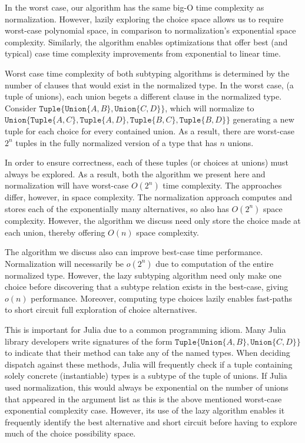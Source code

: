 \documentclass[a4paper,english]{lipics-v2019}
\newcommand{\xt}[1]{\texttt{#1}}
\newcommand{\union}[2]{\xt{Union\{}#1,#2\xt{\}}}
\newcommand{\tuple}[1]{\xt{Tuple\{}#1\xt{\}}}
\begin{document}
\noindent
In the worst case, our algorithm has the same big-O time complexity as
normalization. However, lazily exploring the choice space allows us to
require worst-case polynomial space, in comparison to normalization's
exponential space complexity.  Similarly, the algorithm enables
optimizations that offer best (and typical) case time complexity
improvements from exponential to linear time.

Worst case time complexity of both subtyping algorithms is determined by the
number of clauses that would exist in the normalized type. In the worst case,
(a tuple of unions), each union begets a different clause in the normalized
type. Consider $\tuple{\union{A}{B}, \union{C}{D}}$, which will normalize to
$\union{\tuple{A,C}}{\tuple{A, D}, \tuple{B, C}, \tuple{B, D}}$ generating a 
new tuple for each choice for every contained union. As a result, there are
worst-case $2^n$ tuples in the fully normalized version of a type that has $n$
unions.

In order to ensure correctness, each of these tuples (or choices at unions)
must always be explored. As a result, both the algorithm we present here and
normalization will have worst-case $O(2^n)$ time complexity. The approaches
differ, however, in space complexity. The normalization approach computes and
stores each of the exponentially many alternatives, so also has $O(2^n)$ space
complexity. However, the algorithm we discuss need only store the choice made
at each union, thereby offering $O(n)$ space complexity.

The algorithm we discuss also can improve best-case time performance.
Normalization will necessarily be $o(2^n)$ due to computation of the entire
normalized type. However, the lazy subtyping algorithm need only make one
choice before discovering that a subtype relation exists in the best-case,
giving $o(n)$ performance. Moreover, computing type choices lazily enables
fast-paths to short circuit full exploration of choice alternatives.

This is important for Julia due to a common programming idiom. Many Julia
library developers write signatures of the form $\tuple{\union{A}{B},
\union{C}{D}}$ to indicate that their method can take any of the named
types. When deciding dispatch against these methods, Julia will frequently
check if a tuple containing solely concrete (instantiable) types is a subtype 
of the tuple of unions. If Julia used normalization, this would always be 
exponential on the number of unions that appeared in the argument list as this
is the above mentioned worst-case exponential complexity case. However, its use
of the lazy algorithm enables it frequently identify the best alternative and
short circuit before having to explore much of the choice possibility space.
\end{document}
